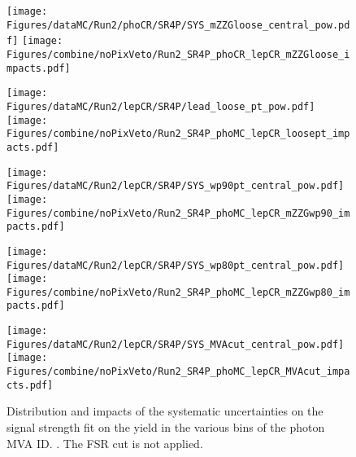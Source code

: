 \label{sec:impacts_inclusive}
\providecommand{\impactswidthscale}{0.6}

\begin{figure}
  \centering
  \texttt{[image: Figures/dataMC/Run2/phoCR/SR4P/SYS\_mZZGloose\_central\_pow.pdf]}
  \hfill
  \texttt{[image: Figures/combine/noPixVeto/Run2\_SR4P\_phoCR\_lepCR\_mZZGloose\_impacts.pdf]}
  \caption{}
  \label{fig:inclusive_cutID_phoCR_mZZGloose}
\end{figure}

\begin{figure}
  \centering
  \texttt{[image: Figures/dataMC/Run2/lepCR/SR4P/lead\_loose\_pt\_pow.pdf]}
  \hfill
  \texttt{[image: Figures/combine/noPixVeto/Run2\_SR4P\_phoMC\_lepCR\_loosept\_impacts.pdf]}
  \caption{}
  \label{fig:inclusive_cutID_phoMC_loosept}
\end{figure}

\begin{figure}
  \centering
  \texttt{[image: Figures/dataMC/Run2/lepCR/SR4P/SYS\_wp90pt\_central\_pow.pdf]}
  \hfill
  \texttt{[image: Figures/combine/noPixVeto/Run2\_SR4P\_phoMC\_lepCR\_mZZGwp90\_impacts.pdf]}
  \caption{}
  \label{fig:inclusive_mvaID_phoMC_mZZGwp90}
\end{figure}

\begin{figure}
  \centering
  \texttt{[image: Figures/dataMC/Run2/lepCR/SR4P/SYS\_wp80pt\_central\_pow.pdf]}
  \hfill
  \texttt{[image: Figures/combine/noPixVeto/Run2\_SR4P\_phoMC\_lepCR\_mZZGwp80\_impacts.pdf]}
  \caption{}
  \label{fig:inclusive_mvaID_phoMC_mZZGwp80}
\end{figure}

\begin{figure}
  \centering
  \texttt{[image: Figures/dataMC/Run2/lepCR/SR4P/SYS\_MVAcut\_central\_pow.pdf]}
  \hfill
  \texttt{[image: Figures/combine/noPixVeto/Run2\_SR4P\_phoMC\_lepCR\_MVAcut\_impacts.pdf]}
  \caption{Distribution and impacts of the systematic uncertainties on the signal strength fit
    on the yield in the various bins of the photon MVA ID.
    .
    The FSR cut is not applied.
  }
  \label{fig:inclusive_kin_phoMC_MVAcut}
\end{figure}
